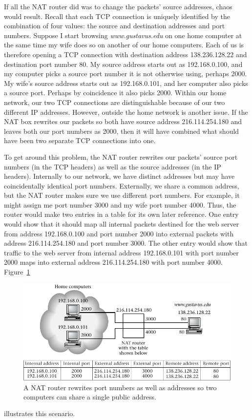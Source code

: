 If all the NAT router did was to change the packets' source addresses,
chaos would result.  Recall that each TCP connection is uniquely
identified by the combination of four values: the source and destination
addresses and port numbers.  Suppose I start browsing \textit{www.gustavus.edu}
on one home computer at the same time my wife does so on another of
our home computers.  Each of us is therefore opening a TCP connection
with destination address 138.236.128.22 and destination port number
80.  My source address starts out as 192.168.0.100, and my computer
picks a source port number it is not otherwise using, perhaps 2000.
My wife's source address starts out as 192.168.0.101, and her computer
also picks a source port.  Perhaps by coincidence it also picks 2000.
Within our home network, our two TCP connections are distinguishable
because of our two different IP addresses.  However, outside the home
network is another issue.  If the NAT box rewrites our packets so both
have source address 216.114.254.180 and leaves both our port numbers
as 2000, then it will have combined what should have been two separate
TCP connections into one.

To get around this problem, the NAT router rewrites our packets'
source port numbers (in the TCP headers) as well as the source
addresses (in the IP headers).  Internally to our network, we have
distinct addresses but may have coincidentally identical port
numbers.  Externally, we share a common address, but the NAT router
makes sure we use different port numbers.  For example, it might
assign me port number 3000 and my wife port number 4000.  Thus, the
router would make two entries in a table for its own later reference.
One entry would show that it should map all internal packets destined
for the web server from
address 192.168.0.100 and port number 2000 into external packets with
address 216.114.254.180 and port number 3000.  The other entry would show
that traffic to the web server from internal address 192.168.0.101 with port number 2000 maps into
external address 216.114.254.180 with port number 4000.
Figure~\ref{scan-9-8}
\begin{figure}
\centerline{\includegraphics{hail_f0910}}
\caption{A NAT router rewrites port numbers as well
  as addresses so two computers can share a single public address.}
\label{scan-9-8}
\end{figure}
illustrates this scenario.

